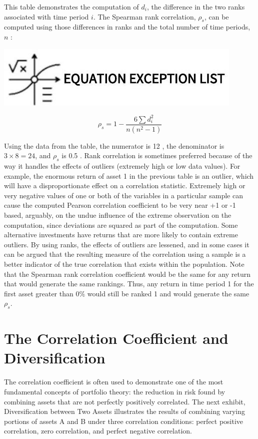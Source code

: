 \documentclass[11pt]{article}
\begin{document}
This table demonstrates the computation of $d_{i}$, the difference in the two ranks associated with time period $i$. The Spearman rank correlation, $\rho_{s}$, can be computed using those differences in ranks and the total number of time periods, $n$ :

\begin{center}
\includegraphics[max width=\textwidth]{2024_04_10_e3fefff2393dcb37755bg-3}
\end{center}

$$
\rho_{s}=1-\frac{6 \sum d_{i}^{2}}{n\left(n^{2}-1\right)}
$$

Using the data from the table, the numerator is 12 , the denominator is $3 \times 8=24$, and $\rho_{s}$ is 0.5 . Rank correlation is sometimes preferred because of the way it handles the effects of outliers (extremely high or low data values). For example, the enormous return of asset 1 in the previous table is an outlier, which will have a disproportionate effect on a correlation statistic. Extremely high or very negative values of one or both of the variables in a particular sample can cause the computed Pearson correlation coefficient to be very near +1 or -1 based, arguably, on the undue influence of the extreme observation on the computation, since deviations are squared as part of the computation. Some alternative investments have returns that are more likely to contain extreme outliers. By using ranks, the effects of outliers are lessened, and in some cases it can be argued that the resulting measure of the correlation using a sample is a better indicator of the true correlation that exists within the population. Note that the Spearman rank correlation coefficient would be the same for any return that would generate the same rankings. Thus, any return in time period 1 for the first asset greater than $0 \%$ would still be ranked 1 and would generate the same $\rho_{s}$.

\section*{The Correlation Coefficient and Diversification}
The correlation coefficient is often used to demonstrate one of the most fundamental concepts of portfolio theory: the reduction in risk found by combining assets that are not perfectly positively correlated. The next exhibit, Diversification between Two Assets illustrates the results of combining varying portions of assets A and B under three correlation conditions: perfect positive correlation, zero correlation, and perfect negative correlation.
\end{document}
